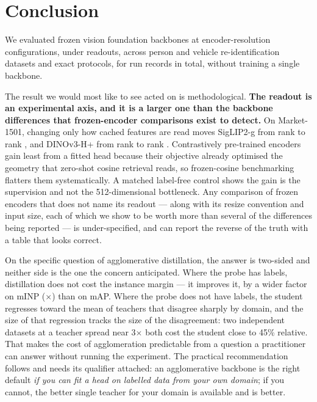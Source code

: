 \section{Conclusion}
We evaluated \nEncoders{} frozen vision foundation backbones at \nEncoderConfigs{}
encoder-resolution configurations, under \nHeads{} readouts, across \nDatasets{} person and
vehicle re-identification datasets and \nProtocols{} exact protocols, for \nRuns{} run records
in total, without training a single backbone.

The result we would most like to see acted on is methodological. \textbf{The readout is an
experimental axis, and it is a larger one than the backbone differences that frozen-encoder
comparisons exist to detect.} On Market-1501, changing only how cached features are read moves
SigLIP2-g from rank \rankSiglipgFrozen{} to rank \rankSiglipgProbed{}, and DINOv3-H+ from rank
\rankDinohpFrozen{} to rank \rankDinohpProbed{}. Contrastively pre-trained encoders gain least from a fitted head because
their objective already optimised the geometry that zero-shot cosine retrieval reads, so
frozen-cosine benchmarking flatters them systematically. A matched label-free control shows the
gain is the supervision and not the 512-dimensional bottleneck. Any comparison of frozen
encoders that does not name its readout --- along with its resize convention and input size,
each of which we show to be worth more than several of the differences being reported --- is
under-specified, and can report the reverse of the truth with a table that looks correct.

On the specific question of agglomerative distillation, the answer is two-sided and neither
side is the one the concern anticipated. Where the probe has labels, distillation does not cost
the instance margin --- it improves it, by a wider factor on mINP (\minpGap{}$\times$) than on
mAP. Where the probe does not have labels, the student regresses toward the mean of teachers
that disagree sharply by domain, and the size of that regression tracks the size of the
disagreement: two independent datasets at a teacher spread near 3$\times$ both cost the
student close to 45\% relative. That makes the cost of agglomeration predictable
from a question a practitioner can answer without running the experiment. The practical
recommendation follows and needs its qualifier attached: an agglomerative backbone is the right
default \emph{if you can fit a head on labelled data from your own domain}; if you cannot, the
better single teacher for your domain is available and is better.


